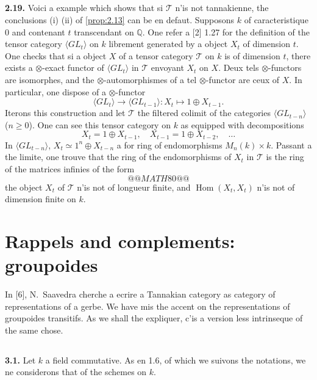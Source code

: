 \documentclass[12pt,a4paper]{article}
\theoremstyle{plain}
\theoremstyle{definition}
\theoremstyle{remark}
\DeclareMathOperator{\Hom}{Hom}
\begin{document}
\subsection{}

\textbf{2.19.} Voici a example which shows that si $\mathcal{T}$ n'is not tannakienne, the conclusions (i) (ii) of \ref{prop:2.13} can be en defaut. Supposons $k$ of caracteristique 0 and contenant $t$ transcendant on $\mathbb{Q}$. One refer a [2] 1.27 for the definition of the tensor category $\langle GL_t \rangle$ on $k$ librement generated by a object $X_t$ of dimension $t$. One checks that si a object $X$ of a tensor category $\mathcal{T}$ on $k$ is of dimension $t$, there exists a $\otimes$-exact functor of $\langle GL_t \rangle$ in $\mathcal{T}$ envoyant $X_t$ on $X$. Deux tels $\otimes$-functors are isomorphes, and the $\otimes$-automorphismes of a tel $\otimes$-functor are ceux of $X$. In particular, one dispose of a $\otimes$-functor
\[
\langle GL_t \rangle \longrightarrow \langle GL_{t-1} \rangle : X_t \mapsto 1 \oplus X_{t-1}.
\]
Iterons this construction and let $\mathcal{T}$ the filtered colimit of the categories $\langle GL_{t-n} \rangle$ ($n \geq 0$). One can see this tensor category on $k$ as equipped with decompositions
\[
X_t = 1 \oplus X_{t-1}, \quad X_{t-1} = 1 \oplus X_{t-2}, \quad \ldots
\]
In $\langle GL_{t-n} \rangle$, $X_t \simeq 1^n \oplus X_{t-n}$ a for ring of endomorphisms $M_n(k) \times k$. Passant a the limite, one trouve that the ring of the endomorphisms of $X_t$ in $\mathcal{T}$ is the ring of the matrices infinies of the form
\[
@@MATH80@@
\]
the object $X_t$ of $\mathcal{T}$ n'is not of longueur finite, and $\Hom(X_t, X_t)$ n'is not of dimension finite on $k$.


\section{Rappels and complements: groupoides}

In [6], N.~Saavedra cherche a ecrire a Tannakian category as category of representations of a gerbe. We have mis the accent on the representations of groupoides transitifs. As we shall the expliquer, c'is a version less intrinseque of the same chose.

\subsection{}

\textbf{3.1.} Let $k$ a field commutative. As en 1.6, of which we suivons the notations, we ne considerons that of the schemes on $k$.
\end{document}

